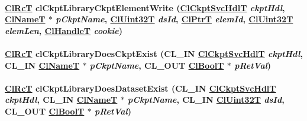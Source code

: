 \hypertarget{group__group10_ga13}{
\paragraph[clCkptLibraryCkptElementWrite]{\setlength{\rightskip}{0pt plus 5cm}\hyperlink{group__group2_ga18}{Cl\-Rc\-T} cl\-Ckpt\-Library\-Ckpt\-Element\-Write (\hyperlink{cl_ckpt_api_8h_a12}{Cl\-Ckpt\-Svc\-Hdl\-T} {\em ckpt\-Hdl}, \hyperlink{struct_cl_name_t}{Cl\-Name\-T} $\ast$ {\em p\-Ckpt\-Name}, \hyperlink{group__group2_ga1}{Cl\-Uint32T} {\em ds\-Id}, \hyperlink{group__group2_ga17}{Cl\-Ptr\-T} {\em elem\-Id}, \hyperlink{group__group2_ga1}{Cl\-Uint32T} {\em elem\-Len}, \hyperlink{group__group2_ga10}{Cl\-Handle\-T} {\em cookie})}\hfill}
\label{group__group10_ga13}


\hypertarget{group__group10_ga10}{
\paragraph[clCkptLibraryDoesCkptExist]{\setlength{\rightskip}{0pt plus 5cm}\hyperlink{group__group2_ga18}{Cl\-Rc\-T} cl\-Ckpt\-Library\-Does\-Ckpt\-Exist (CL\_\-IN \hyperlink{cl_ckpt_api_8h_a12}{Cl\-Ckpt\-Svc\-Hdl\-T} {\em ckpt\-Hdl}, CL\_\-IN \hyperlink{struct_cl_name_t}{Cl\-Name\-T} $\ast$ {\em p\-Ckpt\-Name}, CL\_\-OUT \hyperlink{group__group2_ga8}{Cl\-Bool\-T} $\ast$ {\em p\-Ret\-Val})}\hfill}
\label{group__group10_ga10}


\hypertarget{group__group10_ga11}{
\paragraph[clCkptLibraryDoesDatasetExist]{\setlength{\rightskip}{0pt plus 5cm}\hyperlink{group__group2_ga18}{Cl\-Rc\-T} cl\-Ckpt\-Library\-Does\-Dataset\-Exist (CL\_\-IN \hyperlink{cl_ckpt_api_8h_a12}{Cl\-Ckpt\-Svc\-Hdl\-T} {\em ckpt\-Hdl}, CL\_\-IN \hyperlink{struct_cl_name_t}{Cl\-Name\-T} $\ast$ {\em p\-Ckpt\-Name}, CL\_\-IN \hyperlink{group__group2_ga1}{Cl\-Uint32T} {\em ds\-Id}, CL\_\-OUT \hyperlink{group__group2_ga8}{Cl\-Bool\-T} $\ast$ {\em p\-Ret\-Val})}\hfill}
\label{group__group10_ga11}


